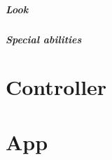 \documentclass[parskip=full]{scrartcl}
\begin{document}
							\par \endgroup
						\subparagraph{Look} \vspace{-0.5cm}
							\par \begingroup
							\leftskip=2cm
							\noindent
							
							\par \endgroup
						\subparagraph{Special abilities} \vspace{-0.5cm}
							\par \begingroup
							\leftskip=2cm
							\noindent
							
							\par \endgroup
		\section{Controller} \vspace{-5mm}
		\section{App} \vspace{-5mm}
	
	
	
	
	
	
\end{document}
